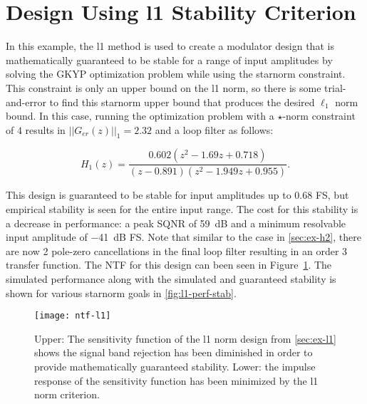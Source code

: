 \section{Design Using \gls{l1} Stability Criterion}
\label{sec:ex-l1}

In this example, the \gls{l1} method is used to create a modulator design that is mathematically guaranteed to be stable for a range of input amplitudes by solving the \gls{GKYP} optimization problem while using the \gls{starnorm} constraint. This constraint is only an upper bound on the \gls{l1} norm, so there is some trial-and-error to find this \gls{starnorm} upper bound that produces the desired $\ell_1$ norm bound. In this case, running the optimization problem with a $\star$-norm constraint of $4$ results in $||G_{er}(z)||_1 = 2.32$ and a loop filter as follows:

\begin{equation*}
	H_1(z) = \frac{0.602\left(z^2 - 1.69z + 0.718\right)}{\left(z - 0.891\right)\left(z^2 - 1.949z + 0.955\right)}.
\end{equation*}

This design is guaranteed to be stable for input amplitudes up to 0.68 \gls{FS}, but empirical stability is seen for the entire input range. The cost for this stability is a decrease in performance: a peak \gls{SQNR} of \SI{59}{\deci\bel} and a minimum resolvable input amplitude of \SI{-41}{\deci\bel} FS. Note that similar to the case in \autoref{sec:ex-h2}, there are now 2 pole-zero cancellations in the final loop filter resulting in an order 3 transfer function. The \gls{NTF} for this design can been seen in Figure~\ref{fig:ntf-l1}. The simulated performance along with the simulated and guaranteed stability is shown for various \gls{starnorm} goals in \autoref{fig:l1-perf-stab}.

\begin{figure}
	\centering
	\texttt{[image: ntf-l1]}
	\caption{Upper: The sensitivity function of the \gls{l1} norm design from \autoref{sec:ex-l1} shows the signal band rejection has been diminished in order to provide mathematically guaranteed stability. Lower: the impulse response of the sensitivity function has been minimized by the \gls{l1} norm criterion.} \label{fig:ntf-l1}
\end{figure}

